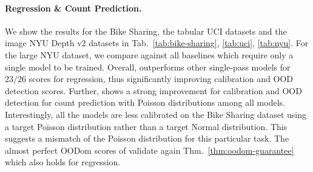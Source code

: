 \paragraph{Regression \& Count Prediction.} We show the results for the Bike Sharing, the tabular UCI datasets and the image NYU Depth v2 datasets in Tab.~\ref{tab:bike-sharing}, \ref{tab:uci}, \ref{tab:nyu}. For the large NYU dataset, we compare against all baselines which require only a single model to be trained. Overall, \NatPNacro{} outperforms other single-pass models for $23/26$ scores for regression, thus significantly improving calibration and OOD detection scores. Further, \NatPNacro{} shows a strong improvement for calibration and OOD detection for count prediction with Poisson distributions among all models. Interestingly, all the models are less calibrated on the Bike Sharing dataset using a target Poisson distribution rather than a target Normal distribution. This suggests a mismatch of the Poisson distribution for this particular task. The almost perfect OODom scores of \NatPNacro{} validate again Thm.~\ref{thm:oodom-guarantee} which also holds for regression.

\begin{table}
\vspace{-0mm}
	\centering
    \caption{Batched Inference Time (in ms), NVIDIA GTX 1080 Ti}
\label{tab:inference-time}
\vspace{-0mm}
\vspace{-0mm}
\end{table}

